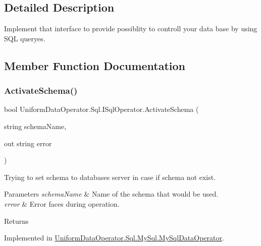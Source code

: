 \subsection{Detailed Description}
Implement that interface to provide possiblity to controll your data base by using S\+QL queryes. 



\subsection{Member Function Documentation}
\mbox{\label{interface_uniform_data_operator_1_1_sql_1_1_i_sql_operator_a5ae8328a464ef80f1ae1bd46a573c265}} 
\subsubsection{\texorpdfstring{Activate\+Schema()}{ActivateSchema()}}
{\footnotesize\ttfamily bool Uniform\+Data\+Operator.\+Sql.\+I\+Sql\+Operator.\+Activate\+Schema (\begin{DoxyParamCaption}\item[{string}]{schema\+Name,  }\item[{out string}]{error }\end{DoxyParamCaption})}



Trying to set schema to databases server in case if schema not exist. 


\begin{DoxyParams}{Parameters}
{\em schema\+Name} & Name of the schema that would be used.\\
\hline
{\em error} & Error faces during operation.\\
\hline
\end{DoxyParams}
\begin{DoxyReturn}{Returns}

\end{DoxyReturn}


Implemented in \mbox{\hyperlink{class_uniform_data_operator_1_1_sql_1_1_my_sql_1_1_my_sql_data_operator_a2ed7d06bc016ae6d07cbcceffc21bbd3}{Uniform\+Data\+Operator.\+Sql.\+My\+Sql.\+My\+Sql\+Data\+Operator}}.

